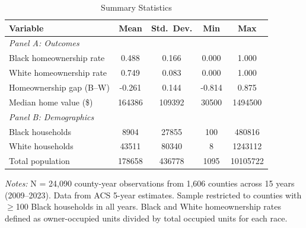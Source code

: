 
\begin{table}[H]
\centering
\caption{Summary Statistics}
\label{tab:summary}
\begin{threeparttable}
\begin{tabular}{lcccc}
\toprule
Variable & Mean & Std.\ Dev. & Min & Max \\
\midrule
\multicolumn{5}{l}{\textit{Panel A: Outcomes}} \\
Black homeownership rate & 0.488 & 0.166 & 0.000 & 1.000 \\
White homeownership rate & 0.749 & 0.083 & 0.000 & 1.000 \\
Homeownership gap (B--W)  & -0.261 & 0.144 & -0.814 & 0.875 \\
Median home value (\$) & 164386 & 109392 & 30500 & 1494500 \\
\midrule
\multicolumn{5}{l}{\textit{Panel B: Demographics}} \\
Black households & 8904 & 27855 & 100 & 480816 \\
White households & 43511 & 80340 & 8 & 1243112 \\
Total population & 178658 & 436778 & 1095 & 10105722 \\
\bottomrule
\end{tabular}
\begin{tablenotes}[flushleft]
\small
\item \textit{Notes:} N = 24,090 county-year observations from 1,606 counties across 15 years (2009--2023). Data from ACS 5-year estimates. Sample restricted to counties with $\geq$100 Black households in all years. Black and White homeownership rates defined as owner-occupied units divided by total occupied units for each race.
\end{tablenotes}
\end{threeparttable}
\end{table}
